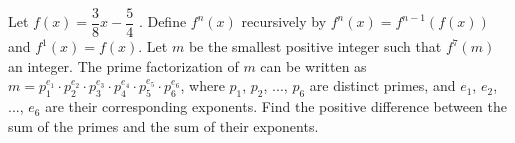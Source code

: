 Let $f(x) = \dfrac{3}{8}x - \dfrac{5}{4}$ . Define $f^n(x)$ recursively by $f^n(x) = f^{n-1}(f(x))$ and $f^1(x) = f(x)$. Let $m$ be the smallest positive integer such that $f^7(m)$ an integer. The prime factorization of $m$ can be written as $m = p^{e_1}_1 \cdot p^{e_2}_2 \cdot p^{e_3}_3 \cdot p^{e_4}_4 \cdot p^{e_5}_5 \cdot p^{e_6}_6$, where $p_1$, $p_2$, $...$, $p_6$ are distinct primes, and $e_1$, $e_2$, $...$, $e_6$ are their corresponding exponents. Find the positive difference between the sum of the primes and the sum of their exponents.
